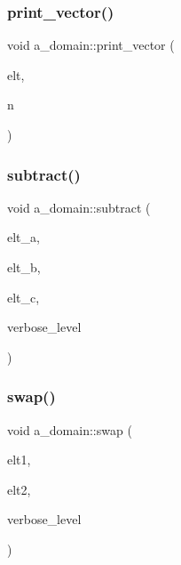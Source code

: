 \mbox{\label{classa__domain_a2819d27696f82b2d71b2a693694da3a0}} 
\subsubsection{\texorpdfstring{print\+\_\+vector()}{print\_vector()}}
{\footnotesize\ttfamily void a\+\_\+domain\+::print\+\_\+vector (\begin{DoxyParamCaption}\item[{\mbox{\hyperlink{galois_8h_a09fddde158a3a20bd2dcadb609de11dc}{I\+NT}} $\ast$}]{elt,  }\item[{\mbox{\hyperlink{galois_8h_a09fddde158a3a20bd2dcadb609de11dc}{I\+NT}}}]{n }\end{DoxyParamCaption})}

\mbox{\label{classa__domain_a76db15a031b035d3a1070e6ba5dece42}} 
\subsubsection{\texorpdfstring{subtract()}{subtract()}}
{\footnotesize\ttfamily void a\+\_\+domain\+::subtract (\begin{DoxyParamCaption}\item[{\mbox{\hyperlink{galois_8h_a09fddde158a3a20bd2dcadb609de11dc}{I\+NT}} $\ast$}]{elt\+\_\+a,  }\item[{\mbox{\hyperlink{galois_8h_a09fddde158a3a20bd2dcadb609de11dc}{I\+NT}} $\ast$}]{elt\+\_\+b,  }\item[{\mbox{\hyperlink{galois_8h_a09fddde158a3a20bd2dcadb609de11dc}{I\+NT}} $\ast$}]{elt\+\_\+c,  }\item[{\mbox{\hyperlink{galois_8h_a09fddde158a3a20bd2dcadb609de11dc}{I\+NT}}}]{verbose\+\_\+level }\end{DoxyParamCaption})}

\mbox{\label{classa__domain_a8bc23463db2935695424142fe9ae866b}} 
\subsubsection{\texorpdfstring{swap()}{swap()}}
{\footnotesize\ttfamily void a\+\_\+domain\+::swap (\begin{DoxyParamCaption}\item[{\mbox{\hyperlink{galois_8h_a09fddde158a3a20bd2dcadb609de11dc}{I\+NT}} $\ast$}]{elt1,  }\item[{\mbox{\hyperlink{galois_8h_a09fddde158a3a20bd2dcadb609de11dc}{I\+NT}} $\ast$}]{elt2,  }\item[{\mbox{\hyperlink{galois_8h_a09fddde158a3a20bd2dcadb609de11dc}{I\+NT}}}]{verbose\+\_\+level }\end{DoxyParamCaption})}

